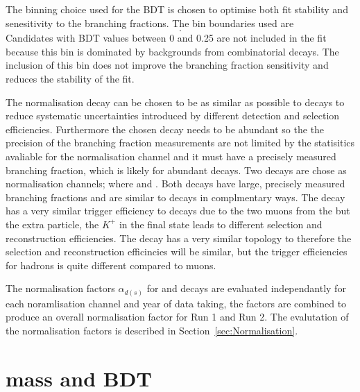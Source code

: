 The binning choice used for the BDT is chosen to optimise both fit stability and senesitivity to the \bmumu branching fractions. The bin boundaries used are
\begin{equation}
[0.25, 0.4, 0.5, 0.6, 1.0].
\label{eq:BDTbins}
\end{equation}
Candidates with BDT values between 0 and 0.25 are not included in the fit because this bin is dominated by backgrounds from combinatorial decays. The inclusion of this bin does not improve the branching fraction sensitivity and reduces the stability of the fit. %

The normalisation decay can be chosen to be as similar as possible to \bmumu decays to reduce systematic uncertainties introduced by different detection and selection efficiencies. Furthermore the chosen decay needs to be abundant so the the precision of the \bmumu branching fraction measurements are not limited by the statisitics avaliable for the normalisation channel and it must have a precisely measured branching fraction, which is likely for abundant decays. Two decays are chose as normalisation channels; \bujpsik where \jpsimumu and \bdkpi. Both decays have large, precisely measured branching fractions and are similar to \bmumu decays in complmentary ways. The \bujpsik decay has a very similar trigger efficiency to \bmumu decays due to the two muons from the \jpsi but the extra particle, the $K^{+}$ in the final state leads to different selection and reconstruction efficiencies. The \bdkpi decay has a very similar topology to \bmumu therefore the selection and reconstruction efficincies will be similar, but the trigger efficiencies for hadrons is quite different compared to muons.  

The normalisation factors $\alpha_{d(s)}$ for \bdmumu and \bsmumu decays are evaluated independantly for each noramlisation channel and year of data taking, the factors are combined to produce an overall normalisation factor for Run 1 and Run 2. The evalutation of the normalisation factors is described in Section~\ref{sec:Normalisation}. 


\section{\bsmumu mass and BDT \pdfs}
\label{sec:signalPdfs}


